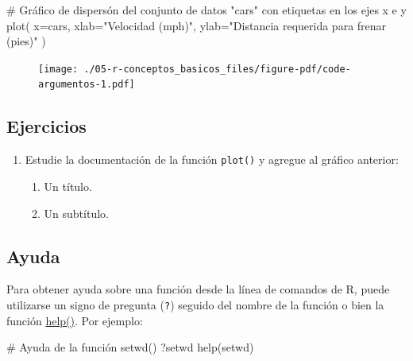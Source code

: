\documentclass[
  letterpaper,
  DIV=11,
  numbers=noendperiod]{scrreprt}
\newenvironment{Shaded}{\begin{snugshade}}{\end{snugshade}}
\newcommand{\AttributeTok}[1]{\textcolor[rgb]{0.40,0.45,0.13}{#1}}
\newcommand{\CommentTok}[1]{\textcolor[rgb]{0.37,0.37,0.37}{#1}}
\newcommand{\FunctionTok}[1]{\textcolor[rgb]{0.28,0.35,0.67}{#1}}
\newcommand{\NormalTok}[1]{\textcolor[rgb]{0.00,0.23,0.31}{#1}}
\newcommand{\StringTok}[1]{\textcolor[rgb]{0.13,0.47,0.30}{#1}}
\providecommand{\tightlist}{%
  \setlength{\itemsep}{0pt}\setlength{\parskip}{0pt}}\usepackage{longtable,booktabs,array}
\begin{document}
\begin{Shaded}
\begin{Highlighting}[]
\CommentTok{\# Gráfico de dispersón del conjunto de datos "cars" con etiquetas en los ejes x e y}
\FunctionTok{plot}\NormalTok{(}
  \AttributeTok{x=}\NormalTok{cars, }
  \AttributeTok{xlab=}\StringTok{"Velocidad (mph)"}\NormalTok{, }
  \AttributeTok{ylab=}\StringTok{"Distancia requerida para frenar (pies)"}
\NormalTok{)}
\end{Highlighting}
\end{Shaded}

\begin{figure}[H]

{\centering \texttt{[image: ./05-r-conceptos\_basicos\_files/figure-pdf/code-argumentos-1.pdf]}

}

\end{figure}

\hypertarget{ejercicios-2}{%
\subsection{Ejercicios}\label{ejercicios-2}}

\begin{enumerate}
\def\labelenumi{\arabic{enumi}.}
\tightlist
\item
  Estudie la documentación de la función \texttt{plot()} y agregue al
  gráfico anterior:

  \begin{enumerate}
  \def\labelenumii{\alph{enumii}.}
  \tightlist
  \item
    Un título.
  \item
    Un subtítulo.
  \end{enumerate}
\end{enumerate}

\hypertarget{ayuda}{%
\subsection{Ayuda}\label{ayuda}}

Para obtener ayuda sobre una función desde la línea de comandos de R,
puede utilizarse un signo de pregunta (\texttt{?}) seguido del nombre de
la función o bien la función
\href{https://rdrr.io/r/utils/help.html}{help()}. Por ejemplo:

\begin{Shaded}
\begin{Highlighting}[]
\CommentTok{\# Ayuda de la función setwd()}
\NormalTok{?setwd}
\FunctionTok{help}\NormalTok{(setwd)}
\end{Highlighting}
\end{Shaded}
\end{document}

